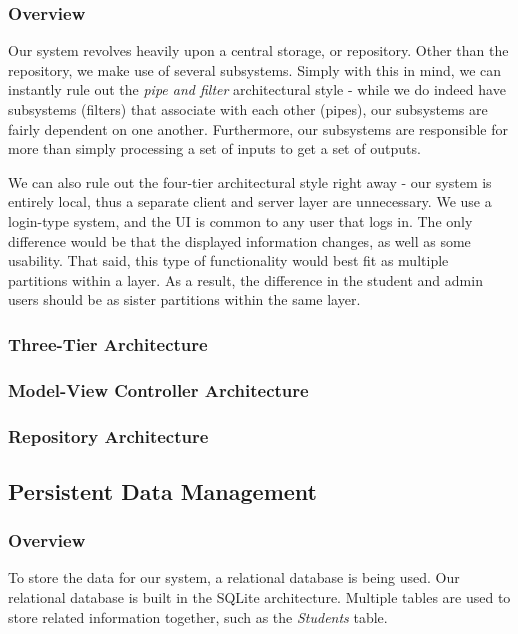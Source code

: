 \documentclass[12pt,letterpaper]{article}
\begin{document}
\subsubsection{Overview}

Our system revolves heavily upon a central storage, or repository. Other than the repository, we make use of several subsystems. Simply with this in mind, we can instantly rule out the {\it pipe and filter} architectural style - while we do indeed have subsystems (filters) that associate with each other (pipes), our subsystems are fairly dependent on one another. Furthermore, our subsystems are responsible for more than simply processing a set of inputs to get a set of outputs. 

We can also rule out the four-tier architectural style right away - our system is entirely local, thus a separate client and server layer are unnecessary. We use a login-type system, and the UI is common to any user that logs in. The only difference would be that the displayed information changes, as well as some usability. That said, this type of functionality would best fit as multiple partitions within a layer. As a result, the difference in the student and admin users should be as sister partitions within the same layer.

\subsubsection{Three-Tier Architecture}
\subsubsection{Model-View Controller Architecture}
\subsubsection{Repository Architecture}

\subsection{Persistent Data Management}
\subsubsection{Overview}

To store the data for our system, a relational database is being used. Our relational database is built in the SQLite architecture. Multiple tables are used to store related information together, such as the \textit{Students} table.
\end{document}
